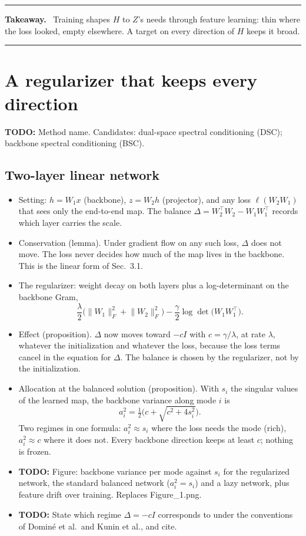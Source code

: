\documentclass[11pt]{article}
\numberwithin{equation}{section}
\theoremstyle{definition}
\theoremstyle{remark}
\newenvironment{takeaway}
{\par\smallskip\noindent\begin{minipage}{\linewidth}\hrule\smallskip\textbf{Takeaway.}\ }
{\smallskip\hrule\end{minipage}\par\smallskip}
\newcommand{\TODO}[1]{\textcolor{red!70!black}{\textbf{TODO:} #1}}
\newcommand{\norm}[1]{\lVert #1\rVert}
\begin{document}
\begin{takeaway}
Training shapes \(H\) to \(Z\)'s needs through feature learning: thin where the loss
looked, empty elsewhere. A target on every direction of \(H\) keeps it broad.
\end{takeaway}


\section{A regularizer that keeps every direction}\label{sec:method}
\TODO{Method name. Candidates: dual-space spectral conditioning (DSC); backbone spectral
conditioning (BSC).}

\subsection{Two-layer linear network}
\begin{itemize}
    \item Setting: \(h = W_1 x\) (backbone), \(z = W_2 h\) (projector), and any loss
    \(\ell(W_2 W_1)\) that sees only the end-to-end map. The balance
    \(\Delta = W_2^\top W_2 - W_1 W_1^\top\) records which layer carries the scale.

    \item Conservation (lemma). Under gradient flow on any such loss, \(\Delta\) does not
    move. The loss never decides how much of the map lives in the backbone. This is the
    linear form of Sec.~3.1.

    \item The regularizer: weight decay on both layers plus a log-determinant on the
    backbone Gram,
    \[
        \frac{\lambda}{2}\big(\norm{W_1}_F^2 + \norm{W_2}_F^2\big)
        - \frac{\gamma}{2} \log\det\big(W_1 W_1^\top\big).
    \]

    \item Effect (proposition). \(\Delta\) now moves toward \(-cI\) with
    \(c = \gamma/\lambda\), at rate \(\lambda\), whatever the initialization and whatever
    the loss, because the loss terms cancel in the equation for \(\Delta\). The balance is
    chosen by the regularizer, not by the initialization.

    \item Allocation at the balanced solution (proposition). With \(s_i\) the singular
    values of the learned map, the backbone variance along mode \(i\) is
    \[
        a_i^2 = \tfrac12\Big(c + \sqrt{c^2 + 4 s_i^2}\Big).
    \]
    Two regimes in one formula: \(a_i^2 \approx s_i\) where the loss needs the mode
    (rich), \(a_i^2 \approx c\) where it does not. Every backbone direction keeps at least
    \(c\); nothing is frozen.

    \item \TODO{Figure: backbone variance per mode against \(s_i\) for the regularized
    network, the standard balanced network (\(a_i^2 = s_i\)) and a lazy network, plus
    feature drift over training. Replaces Figure\_1.png.}

    \item \TODO{State which regime \(\Delta = -cI\) corresponds to under the conventions
    of Domin\'e et al.\ and Kunin et al., and cite.}
\end{itemize}
\end{document}
